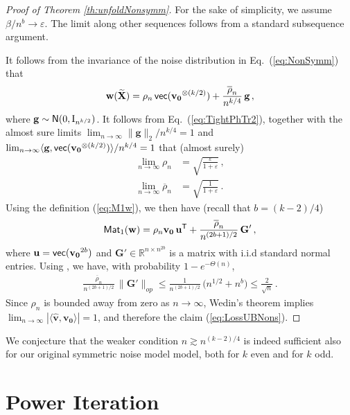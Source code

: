 \documentclass[11pt]{article}
\theoremstyle{definition}
\def\orho{\overline{\rho}}
\def\<{\langle}
\def\>{\rangle}
\def\reals{\mathbb{R}}
\def\sT{{\sf T}}
\def\bu{\mathbf{u}}
\def\hbv{\mathbf{\widehat{v}}}
\def\bg{\mathbf{g}}
\def\bw{\mathbf{w}}
\def\bvz{\mathbf{v_0}}
\def\btX{\mathbf{\widetilde{X}}}
\def\vec{{\sf{vec}}}
\def\bG{\mathbf{G}}
\def\normal{{\sf N}}
\def\M{{\sf Mat}}
\def\id{{\rm I}}
\def\eps{\varepsilon}
\begin{document}
\begin{proof}[Proof of Theorem \ref{th:unfoldNonsymm}]
For the sake of simplicity, we assume $\beta/n^b\to \eps$. The limit
along other sequences follows from a standard subsequence argument.

It follows from the invariance of the noise distribution in
Eq.~(\ref{eq:NonSymm}) that 
%
\begin{align}
%
\bw(\btX) = \rho_n\, \vec(\bvz^{\otimes (k/2)}) + \frac{\orho_n}{n^{k/4}}\, \bg\,
,
%
\end{align}
%
where $\bg\sim\normal(0,\id_{n^{k/2}})$. It follows from
Eq.~(\ref{eq:TightPhTr2}),
together with the almost sure limits
$\lim_{n\to\infty}\|\bg\|_2/n^{k/4}=1$ and 
$\lim_{n\to\infty}\<\bg,\vec(\bvz^{\otimes (k/2)})\> /n^{k/4}=1$ that
(almost surely)
%
\begin{align}
%
\lim_{n\to\infty} \rho_n &= \sqrt{\frac{\eps}{1+\eps}}\, ,\\
\lim_{n\to\infty} \orho_n &= \sqrt{\frac{1}{1+\eps}}\, .
%
\end{align}
%
Using the definition (\ref{eq:M1w}), we then have (recall that $b = (k-2)/4$)
%
\begin{align}
%
\M_1(\bw) = \rho_n \bvz\, \bu^{\sT} + \frac{\orho_n}{n^{(2b+1)/2}}\,
\bG'\, ,\label{eq:DecompositionM1}
%
\end{align}
%
where $\bu = \vec(\bvz^{2b})$ and $\bG'
\in \reals^{n\times n^{2b}}$ is a matrix with i.i.d standard normal
entries.
Using \cite{davidson2001local}, we have, with probability $1-e^{-\Theta(n)}$,
%
\begin{align}
%
\frac{\orho_n}{n^{(2b+1)/2}}\, \|\bG'\|_{op}\le
\frac{1}{n^{(2b+1)/2}}\, \big(n^{1/2}+n^b\big) \le \frac{2}{\sqrt{n}}\, .
%
\end{align}
%
Since $\rho_n$ is bounded away from zero as $n\to\infty$, Wedin's
theorem implies $\lim_{n\to\infty}|\< \hbv,\bvz\>| =1$, and therefore
the claim (\ref{eq:LossUBNons}).
%
 \end{proof}
%

We conjecture that the weaker condition $n\gtrsim n^{(k-2)/4}$ is
indeed sufficient also for our original symmetric noise model model,
both for $k$ even and for $k$ odd.


\section{Power Iteration}
\end{document}
